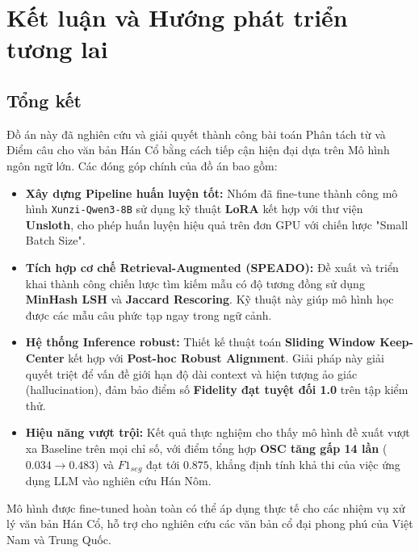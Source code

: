 \chapter{Kết luận và Hướng phát triển tương lai}
\label{chap:conclusion}

\section{Tổng kết}

Đồ án này đã nghiên cứu và giải quyết thành công bài toán Phân tách từ và Điểm câu cho văn bản Hán Cổ bằng cách tiếp cận hiện đại dựa trên Mô hình ngôn ngữ lớn. Các đóng góp chính của đồ án bao gồm:

\begin{itemize}
    \item \textbf{Xây dựng Pipeline huấn luyện tốt:} Nhóm đã fine-tune thành công mô hình \texttt{Xunzi-Qwen3-8B} sử dụng kỹ thuật \textbf{LoRA} kết hợp với thư viện \textbf{Unsloth}, cho phép huấn luyện hiệu quả trên đơn GPU với chiến lược "Small Batch Size".
    
    \item \textbf{Tích hợp cơ chế Retrieval-Augmented (SPEADO):} Đề xuất và triển khai thành công chiến lược tìm kiếm mẫu có độ tương đồng sử dụng \textbf{MinHash LSH} và \textbf{Jaccard Rescoring}. Kỹ thuật này giúp mô hình học được các mẫu câu phức tạp ngay trong ngữ cảnh.
    
    \item \textbf{Hệ thống Inference robust:} Thiết kế thuật toán \textbf{Sliding Window Keep-Center} kết hợp với \textbf{Post-hoc Robust Alignment}. Giải pháp này giải quyết triệt để vấn đề giới hạn độ dài context và hiện tượng ảo giác (hallucination), đảm bảo điểm số \textbf{Fidelity đạt tuyệt đối 1.0} trên tập kiểm thử.
    
    \item \textbf{Hiệu năng vượt trội:} Kết quả thực nghiệm cho thấy mô hình đề xuất vượt xa Baseline trên mọi chỉ số, với điểm tổng hợp \textbf{OSC tăng gấp 14 lần} ($0.034 \to 0.483$) và $F1_{seg}$ đạt tới $0.875$, khẳng định tính khả thi của việc ứng dụng LLM vào nghiên cứu Hán Nôm.
\end{itemize}

Mô hình được fine-tuned hoàn toàn có thể áp dụng thực tế cho các nhiệm vụ xử lý văn bản Hán Cổ, hỗ trợ cho nghiên cứu các văn bản cổ đại phong phú của Việt Nam và Trung Quốc.

